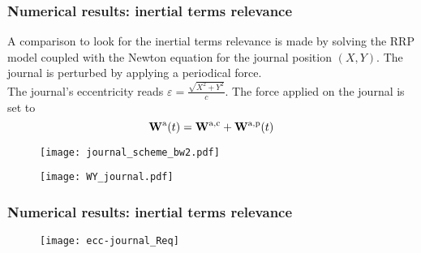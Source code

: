 \documentclass[10pt,aspectratio=169]{beamer}
\begin{document}
\begin{frame}
\frametitle{Numerical results: inertial terms relevance}

\begin{minipage}{0.5\linewidth}
A comparison to look for the inertial terms relevance is made by solving the RRP model coupled with the Newton equation for the journal position $(X,Y)$. The journal is perturbed by applying a periodical force.\\

The journal's eccentricity reads $\varepsilon=\frac{\sqrt{X^2+Y^2}}{c}$. The force applied on the journal is set to
\begin{equation*}
\mathbf{W}^\textnormal{a}(t)=\mathbf{W}^{\textnormal{a},\textnormal{c}}+\mathbf{W}^{\textnormal{a},\textnormal{p}}(t)
\end{equation*}
\end{minipage}%
\begin{minipage}{0.5\linewidth}\vspace*{1.0cm}
\begin{figure}
	\texttt{[image: journal\_scheme\_bw2.pdf]}
\end{figure}
\end{minipage}\vspace*{-0.2cm}
\begin{figure}
	\centering 
	\def\svgwidth{\textwidth}	
	\texttt{[image: WY\_journal.pdf]}
\end{figure}
\end{frame}  

\begin{frame}\vspace*{0.5cm}
\frametitle{Numerical results: inertial terms relevance}
\begin{figure}
	\centering 
	\def\svgwidth{\textwidth}	
	\texttt{[image: ecc-journal\_Req]}
\end{figure}
\end{frame}  
\end{document}
